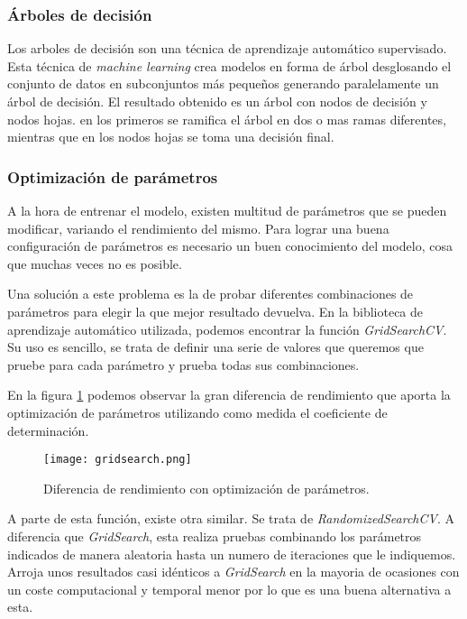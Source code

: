 \subsubsection{Árboles de decisión}

Los arboles de decisión son una técnica de aprendizaje automático supervisado. Esta técnica de \emph{machine learning} crea modelos en forma de árbol  desglosando el conjunto de datos en subconjuntos más pequeños generando paralelamente un árbol de decisión. El resultado obtenido es un árbol con nodos de decisión y nodos hojas. en los primeros se ramifica el árbol en dos o mas ramas diferentes, mientras que en los nodos hojas se toma una decisión final.

\subsubsection{Optimización de parámetros}

A la hora de entrenar el modelo, existen multitud de parámetros que se pueden modificar, variando el rendimiento del mismo. Para lograr una buena configuración de parámetros es necesario un buen conocimiento del modelo, cosa que muchas veces no es posible.

Una solución a este problema es la de probar diferentes combinaciones de parámetros para elegir la que mejor resultado devuelva. En la biblioteca de aprendizaje automático utilizada, podemos encontrar la función \emph{GridSearchCV}. Su uso es sencillo, se trata de definir una serie de valores que queremos que pruebe para cada parámetro y prueba todas sus combinaciones.

En la figura \ref{parametros} podemos observar la gran diferencia de rendimiento que aporta la optimización de parámetros utilizando como medida el coeficiente de determinación.

\begin{figure}%
	\centering
	\texttt{[image: gridsearch.png]}
	\caption[Diferencia de rendimiento con optimización de parámetros]{Diferencia de rendimiento con optimización de parámetros.}\label{parametros}
\end{figure}

A parte de esta función, existe otra similar. Se trata de \emph{RandomizedSearchCV}. A diferencia que \emph{GridSearch}, esta realiza pruebas combinando los parámetros indicados de manera aleatoria hasta un numero de iteraciones que le indiquemos. Arroja unos resultados casi idénticos a \emph{GridSearch} en la mayoria de ocasiones con un coste computacional y temporal menor por lo que es una buena alternativa a esta.